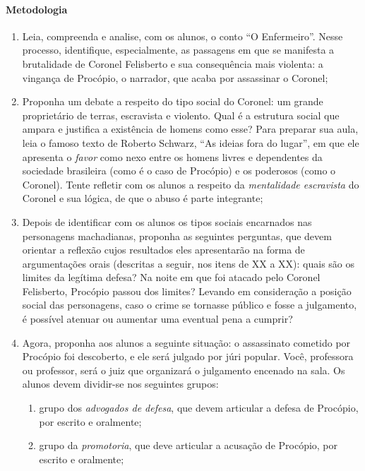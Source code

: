 \documentclass[12pt]{extarticle}
\begin{document}
\paragraph{Metodologia}
\begin{enumerate}
\item Leia, compreenda e analise, com os alunos, o conto ``O Enfermeiro''.
Nesse processo, identifique, especialmente, as passagens em que se
manifesta a brutalidade de Coronel Felisberto e sua consequência mais
violenta: a vingança de Procópio, o narrador, que acaba por assassinar o
Coronel;

\item Proponha um debate a respeito do tipo social do Coronel: um grande
proprietário de terras, escravista e violento. Qual é a estrutura social
que ampara e justifica a existência de homens como esse? Para preparar
sua aula, leia o famoso texto de Roberto Schwarz, ``As ideias fora do
lugar'', em que ele apresenta o \emph{favor} como nexo entre os homens
livres e dependentes da sociedade brasileira (como é o caso de Procópio)
e os poderosos (como o Coronel). Tente refletir com os alunos a respeito
da \emph{mentalidade escravista} do Coronel e sua lógica, de que o abuso
é parte integrante;

\item Depois de identificar com os alunos os tipos sociais encarnados nas
personagens machadianas, proponha as seguintes perguntas, que devem
orientar a reflexão cujos resultados eles apresentarão na forma de
argumentações orais (descritas a seguir, nos itens de XX a XX): quais
são os limites da legítima defesa? Na noite em que foi atacado pelo
Coronel Felisberto, Procópio passou dos limites? Levando em consideração
a posição social das personagens, caso o crime se tornasse público e
fosse a julgamento, é possível atenuar ou aumentar uma eventual pena a
cumprir?

\item Agora, proponha aos alunos a seguinte situação: o assassinato
cometido por Procópio foi descoberto, e ele será julgado por júri
popular. Você, professora ou professor, será o juiz que organizará o
julgamento encenado na sala. Os alunos devem dividir-se nos seguintes
grupos:

\begin{enumerate}
\item grupo dos \emph{advogados de defesa}, que devem articular a defesa de
Procópio, por escrito e oralmente;

\item grupo da \emph{promotoria}, que deve articular a acusação de
Procópio, por escrito e oralmente;


\end{enumerate}
\end{enumerate}
\end{document}
